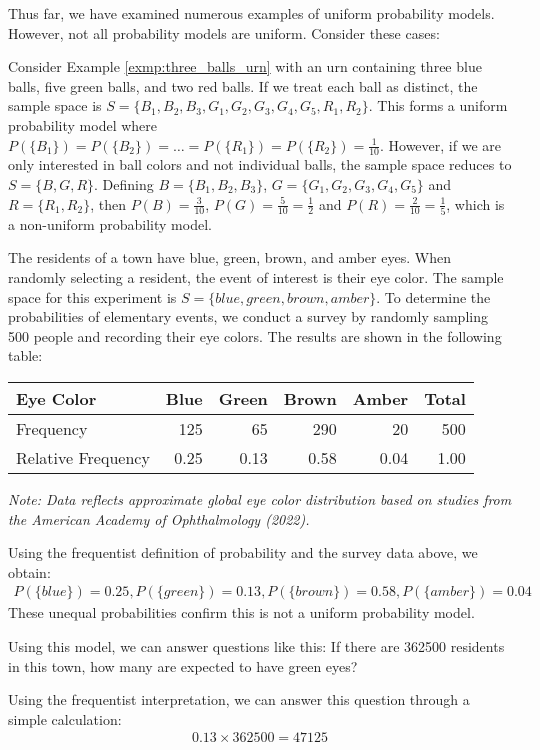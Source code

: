 Thus far, we have examined numerous examples of uniform probability models.
However, not all probability models are uniform.
Consider these cases:

\begin{exmp}
	Consider Example \autoref{exmp:three_balls_urn} with an urn containing three blue balls, five green balls, and two red balls.
	If we treat each ball as distinct, the sample space is \( S = \{ B_1, B_2, B_3, G_1, G_2, G_3, G_4, G_5, R_1, R_2 \} \).
	This forms a uniform probability model where \( P(\{B_1\}) = P(\{B_2\}) = \ldots = P(\{R_1\}) = P(\{R_2\}) = \frac{1}{10} \).
	However, if we are only interested in ball colors and not individual balls,
	the sample space reduces to \( S = \{ B, G, R \} \).
	Defining \( B = \{ B_1, B_2, B_3 \} \), \( G = \{ G_1, G_2, G_3, G_4, G_5 \} \) and \( R = \{ R_1, R_2 \} \),
	then \( P(B) = \frac{3}{10} \), \( P(G) = \frac{5}{10} = \frac{1}{2} \) and \( P(R) = \frac{2}{10} = \frac{1}{5} \),
	which is a non-uniform probability model.
\end{exmp}

\begin{exmp}\label{exmp:eye_color}
	The residents of a town have blue, green, brown, and amber eyes.
	When randomly selecting a resident, the event of interest is their eye color.
	The sample space for this experiment is \( S = \{ blue, green, brown, amber \} \).
	To determine the probabilities of elementary events, we conduct a survey by randomly sampling 500 people and recording their eye colors.
	The results are shown in the following table:
	\begin{center}
	\begin{tabular}{|l|r|r|r|r|r|}
	\hline
	\textbf{Eye Color} & \textbf{Blue} & \textbf{Green} & \textbf{Brown} & \textbf{Amber} & \textbf{Total} \\ 
	\hline
	Frequency & 125 & 65 & 290 & 20 & 500 \\
	Relative Frequency & 0.25 & 0.13 & 0.58 & 0.04 & 1.00 \\
	\hline
	\end{tabular}
	\end{center}
	{\footnotesize\textit{Note: Data reflects approximate global eye color distribution based on studies from the American Academy of Ophthalmology (2022).}}
	
	Using the frequentist definition of probability and the survey data above, we obtain:
	\begin{align*}
		P(\{blue\}) = 0.25, P(\{green\}) = 0.13, P(\{brown\}) = 0.58, P(\{amber\}) = 0.04
	\end{align*}
	These unequal probabilities confirm this is not a uniform probability model.

	Using this model, we can answer questions like this:
	If there are 362500 residents in this town, how many are expected to have green eyes?
	
	Using the frequentist interpretation, we can answer this question through a simple calculation:
	\begin{align*}
		0.13 \times 362500 = 47125
	\end{align*}
\end{exmp}


